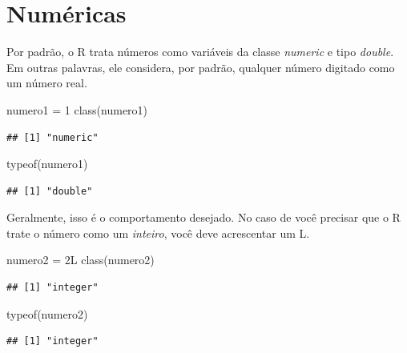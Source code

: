 \documentclass[
]{book}
\newenvironment{Shaded}{\begin{snugshade}}{\end{snugshade}}
\newcommand{\DecValTok}[1]{\textcolor[rgb]{0.00,0.00,0.81}{#1}}
\newcommand{\FunctionTok}[1]{\textcolor[rgb]{0.00,0.00,0.00}{#1}}
\newcommand{\NormalTok}[1]{#1}
\newcommand{\OtherTok}[1]{\textcolor[rgb]{0.56,0.35,0.01}{#1}}
\begin{document}
\hypertarget{numuxe9ricas}{%
\section{Numéricas}\label{numuxe9ricas}}

Por padrão, o R trata números como variáveis da classe \emph{numeric} e tipo \emph{double}. Em outras palavras, ele considera, por padrão, qualquer número digitado como um número real.

\begin{Shaded}
\begin{Highlighting}[]
\NormalTok{numero1 }\OtherTok{=} \DecValTok{1}
\FunctionTok{class}\NormalTok{(numero1)}
\end{Highlighting}
\end{Shaded}

\begin{verbatim}
## [1] "numeric"
\end{verbatim}

\begin{Shaded}
\begin{Highlighting}[]
\FunctionTok{typeof}\NormalTok{(numero1)}
\end{Highlighting}
\end{Shaded}

\begin{verbatim}
## [1] "double"
\end{verbatim}

Geralmente, isso é o comportamento desejado. No caso de você precisar que o R trate o número como um \emph{inteiro}, você deve acrescentar um L.

\begin{Shaded}
\begin{Highlighting}[]
\NormalTok{numero2 }\OtherTok{=}\NormalTok{ 2L}
\FunctionTok{class}\NormalTok{(numero2)}
\end{Highlighting}
\end{Shaded}

\begin{verbatim}
## [1] "integer"
\end{verbatim}

\begin{Shaded}
\begin{Highlighting}[]
\FunctionTok{typeof}\NormalTok{(numero2)}
\end{Highlighting}
\end{Shaded}

\begin{verbatim}
## [1] "integer"
\end{verbatim}
\end{document}
